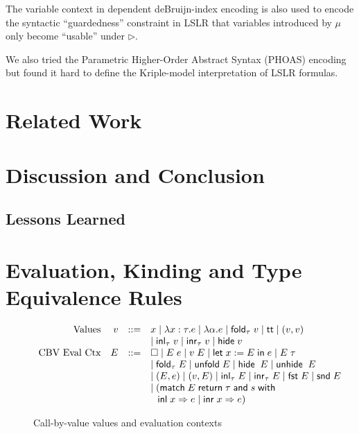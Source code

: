\documentclass[preprint]{sigplanconf}
\newcommand{\symlet}{\mathsf{let\;}}
\newcommand{\symin}{\mathsf{\;in\;}}
\newcommand{\symand}{\mathsf{\;and\;}}
\newcommand{\symmatch}{\mathsf{match}}
\newcommand{\symwith}{\mathsf{\;with\;}}
\newcommand{\symreturn}{\mathsf{\;return\;}}
\newcommand{\syminl}{\mathsf{inl}}
\newcommand{\syminr}{\mathsf{inr}}
\newcommand{\symfold}{\mathsf{fold}}
\newcommand{\symunfold}{\mathsf{unfold}}
\newcommand{\symhide}{\mathsf{hide}}
\newcommand{\symunhide}{\mathsf{unhide}}
\newcommand{\symtt}{\mathsf{tt}}
\newcommand{\later}{\triangleright}
\newcommand{\symfst}{\mathsf{fst}}
\newcommand{\symsnd}{\mathsf{snd}}
\begin{document}
The variable context in dependent deBruijn-index encoding is also used to encode the syntactic ``guardedness'' constraint in LSLR that variables introduced by $\mu$ only become ``usable'' under $\later$.

We also tried the Parametric Higher-Order Abstract Syntax (PHOAS) encoding but found it hard to define the Kriple-model interpretation of LSLR formulas.

\section{\label{section-related}Related Work}

\section{\label{section-discussion}Discussion and Conclusion}

\subsection{Lessons Learned}

\appendix

\section{\label{append1}Evaluation, Kinding and Type Equivalence Rules}

\begin{figure}
$$\begin{array}{rrcl}
  \textrm{Values} & v &::=& x \mid \lambda x:\tau.e \mid \lambda \alpha.e \mid \symfold_\tau\;v \mid \symtt \mid (v,v) \\
  & & & \mid \syminl_\tau\;v \mid \syminr_\tau\;v \mid \symhide\; v \\
  \textrm{CBV Eval Ctx} & E &::=& \Box \mid E\;e \mid v\;E \mid \symlet x := E\symin e \mid E\;\tau \\
  & & & \mid \symfold_\tau\;E \mid \symunfold\;E \mid \symhide\;\;E \mid \symunhide\;\;E \\
  & & & \mid (E, e) \mid (v, E) \mid \syminl_\tau\;E \mid \syminr_\tau\;E \mid \symfst\;E \mid \symsnd\;E \\
  & & & \mid (\symmatch\;E\symreturn \tau \symand s \symwith \\
  & & & \hspace{.1in} \syminl\;x\Rightarrow e\;|\;\syminr\;x\Rightarrow e)
\end{array}$$
\caption{\label{eval-aux}Call-by-value values and evaluation contexts}
\end{figure}
\end{document}
